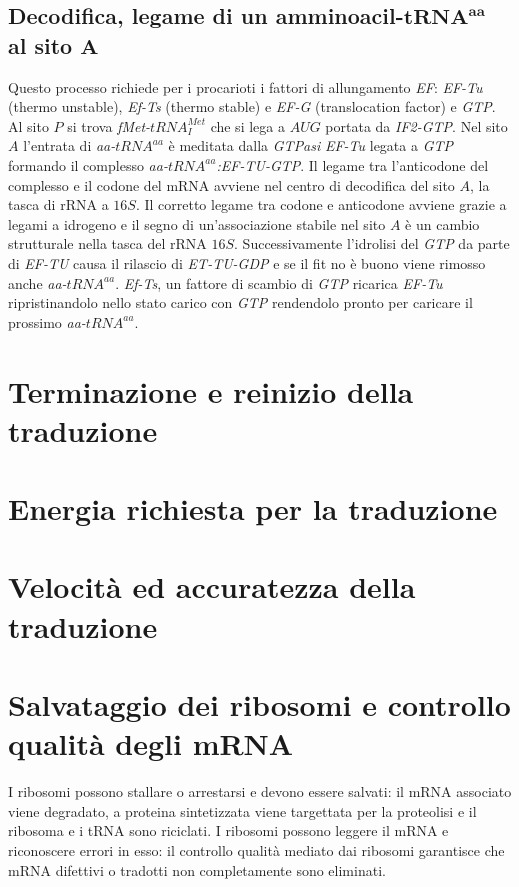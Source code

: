 \subsection{Decodifica, legame di un amminoacil-$\mathbf{tRNA^{aa}}$ al sito $\mathbf{A}$}
Questo processo richiede per i procarioti i fattori di allungamento \emph{EF}: \emph{EF-Tu} (thermo unstable), \emph{Ef-Ts} (thermo stable) e \emph{EF-G} (translocation factor) e \emph{GTP}. Al sito 
$P$ si trova \emph{fMet-$tRNA_I^{Met}$} che si lega a $AUG$ portata da \emph{IF2-GTP}. Nel sito $A$ l'entrata di \emph{aa-$tRNA^{aa}$} \`e meditata dalla \emph{GTPasi} \emph{EF-Tu} legata a 
\emph{GTP} formando il complesso \emph{aa-$tRNA^{aa}$:EF-TU-GTP}. Il legame tra l'anticodone del complesso e il codone del mRNA avviene nel centro di decodifica del sito $A$, la tasca di rRNA a $16S$. 
Il corretto legame tra codone e anticodone avviene grazie a legami a idrogeno e il segno di un'associazione stabile nel sito $A$ \`e un cambio strutturale nella tasca del rRNA $16S$. Successivamente
l'idrolisi del \emph{GTP} da parte di \emph{EF-TU} causa il rilascio di \emph{ET-TU-GDP} e se il fit no \`e buono viene rimosso anche \emph{aa-$tRNA^{aa}$}. \emph{Ef-Ts}, un fattore di scambio di 
\emph{GTP} ricarica \emph{EF-Tu} ripristinandolo nello stato carico con \emph{GTP} rendendolo pronto per caricare il prossimo \emph{aa-$tRNA^{aa}$}. 


\section{Terminazione e reinizio della traduzione}

\section{Energia richiesta per la traduzione}

\section{Velocit\`a ed accuratezza della traduzione}

\section{Salvataggio dei ribosomi e controllo qualit\`a degli mRNA}
I ribosomi possono stallare o arrestarsi e devono essere salvati: il mRNA associato viene degradato, a proteina sintetizzata viene targettata per la proteolisi e il ribosoma e i 
tRNA sono riciclati. I ribosomi possono leggere il mRNA e riconoscere errori in esso: il controllo qualit\`a mediato dai ribosomi garantisce che mRNA difettivi o tradotti non 
completamente sono eliminati. 

